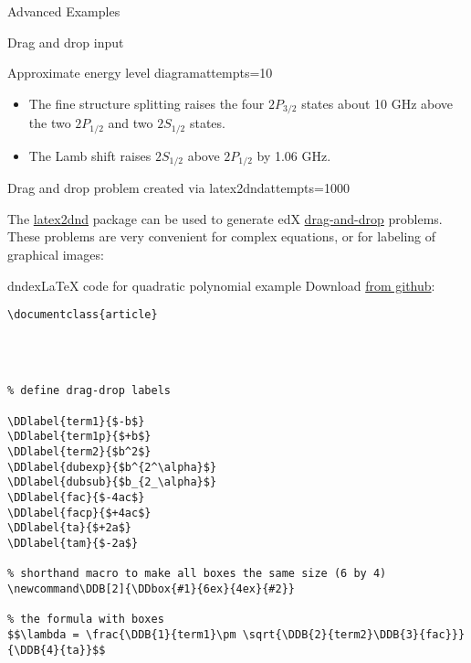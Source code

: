 \begin{edXchapter}{Advanced Examples}
\begin{edXsection}{Drag and drop input}
\begin{edXvertical}
\begin{edXproblem}{Approximate energy level diagram}{attempts=10}
\begin{edXsolution}
\begin{itemize}

\item The fine structure splitting raises the four $2P_{3/2}$ states about
10 GHz above the two $2P_{1/2}$ and two $2S_{1/2}$ states.

\item The Lamb shift raises $2S_{1/2}$ above $2P_{1/2}$ by 1.06 GHz.

\end{itemize}

\end{edXsolution}

\end{edXproblem}


\end{edXvertical}


\begin{edXvertical}

\begin{edXproblem}{Drag and drop problem created via latex2dnd}{attempts=1000}

The \href{https://github.com/mitocw/latex2dnd}{latex2dnd} package can
be used to generate edX
\href{http://edx.readthedocs.org/projects/devdata/en/latest/course_data_formats/drag_and_drop/drag_and_drop_input.html}{drag-and-drop}
problems.  These problems are very convenient for complex equations,
or for labeling of graphical images:

\begin{edXshowhide}{dndex}{LaTeX code for quadratic polynomial example}
Download \href{https://github.com/mitocw/latex2dnd/blob/master/latex2dnd/testtex/quadratic.tex}{from github}:
\begin{verbatim}
\documentclass{article}




% define drag-drop labels

\DDlabel{term1}{$-b$}
\DDlabel{term1p}{$+b$}
\DDlabel{term2}{$b^2$}
\DDlabel{dubexp}{$b^{2^\alpha}$}
\DDlabel{dubsub}{$b_{2_\alpha}$}
\DDlabel{fac}{$-4ac$}
\DDlabel{facp}{$+4ac$}
\DDlabel{ta}{$+2a$}
\DDlabel{tam}{$-2a$}

% shorthand macro to make all boxes the same size (6 by 4)
\newcommand\DDB[2]{\DDbox{#1}{6ex}{4ex}{#2}}

% the formula with boxes
$$\lambda = \frac{\DDB{1}{term1}\pm \sqrt{\DDB{2}{term2}\DDB{3}{fac}}}{\DDB{4}{ta}}$$


\end{verbatim}
\end{edXshowhide}
\end{edXproblem}
\end{edXvertical}
\end{edXsection}
\end{edXchapter}
